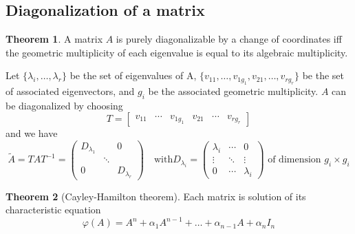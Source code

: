 \documentclass{book}
\theoremstyle{definition}
\newtheorem{theorem}{Theorem}[section]
\theoremstyle{remark}
\theoremstyle{remark}
\begin{document}
\subsection{Diagonalization of a matrix}
\begin{theorem}

A matrix $A$ is purely diagonalizable by a change of coordinates iff the geometric multiplicity of each eigenvalue is equal to its algebraic multiplicity.

Let $\{\lambda_i,\dots,\lambda_r\}$ be the set of eigenvalues of A, $\{v_{11},\dots,v_{1g_1},{v_{21}},\dots,v_{rg_r}\}$ be the set of associated eigenvectors, and $g_i$ be the associated geometric multiplicity. $A$ can be diagonalized by choosing 
\[
T=\begin{bmatrix}
    v_{11} & \cdots & v_{1g_1} & v_{21} & \cdots & v_{rg_r}
\end{bmatrix}
\]
and we have
\[
\tilde{A}=TAT^{-1}=\begin{pmatrix}
    D_{\lambda_1} & & 0\\
    & \ddots & \\
    0 & & D_{\lambda_r}
\end{pmatrix} \quad \text{with} D_{\lambda_i} = \begin{pmatrix}
    \lambda_i & \cdots & 0\\
    \vdots & \ddots & \vdots\\
    0 & \cdots & \lambda_i
\end{pmatrix} \text{ of dimension } g_i \times g_i
\]
\end{theorem}


\begin{theorem}[Cayley-Hamilton theorem]
Each matrix is solution of its characteristic equation
\[
\varphi(A)=A^n+\alpha_1 A^{n-1}+ \dots + \alpha_{n-1} A + \alpha_nI_n
\]
\end{theorem}
\end{document}
